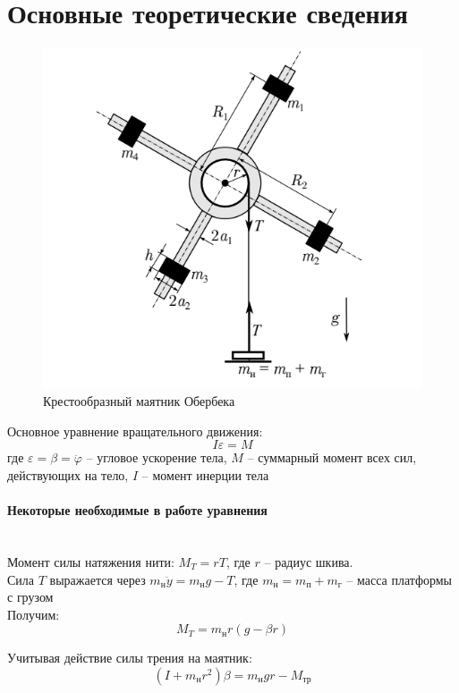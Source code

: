 \documentclass[a4paper,12pt]{article}
\begin{document}
	\section{Основные теоретические сведения}
	\begin{figure}[H]
		\vspace{0mm}
		\centering
		\includegraphics[width=0.75\linewidth,angle=0]{pend.png} 
		\caption{Крестообразный маятник Обербека}
		\label{fig:1}
	\end{figure}
	Основное уравнение вращательного движения:
	\begin{equation}
		\label{eq:1}
		I\varepsilon=M
	\end{equation}
	где $\varepsilon=\beta=\ddot{\varphi}$ -- угловое ускорение тела, $M$ -- суммарный момент всех сил, действующих на тело, $I$ -- момент инерции тела
	
	\paragraph{Некоторые необходимые в работе уравнения}\mbox{}\\
	Момент силы натяжения нити:
	$M_T=rT$, где $r$ -- радиус шкива.\\
	
	\noindent Сила $T$ выражается через $m_\text{н}\ddot{y}=m_\text{н}g-T$, где $m_\text{н}=m_\text{п}+m_\text{г}$ -- масса платформы с грузом\\
	
	\noindent Получим:
	\begin{equation}
		\label{eq:2}
		M_T=m_\text{н}r(g-\beta r)
	\end{equation} 
	
	\noindent Учитывая действие силы трения на маятник:
	\begin{equation}
		\label{eq:3}
		(I+m_\text{н}r^2)\beta=m_\text{н}gr-M_\text{тр}
	\end{equation}
	
\end{document}
